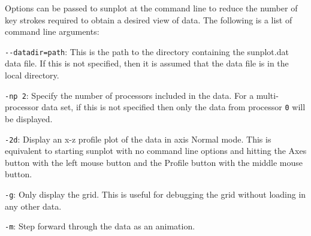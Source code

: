 Options can be passed to sunplot at the command line to reduce the number of key strokes
required to obtain a desired view of data.  The following is a list of command line arguments:
\begin{list}{}
\item \verb+--datadir=path+: This is the path to the directory containing the sunplot.dat
data file.  If this is not specified, then it is assumed that the data file is in the local
directory.
\item \verb+-np 2+: Specify the number of processors included in the data.  For a multi-processor
data set, if this is not specified then only the data from processor \verb+0+ will be displayed.
\item \verb+-2d+: Display an x-z profile plot of the data in axis Normal mode.  This is equivalent
to starting sunplot with no command line options and hitting the Axes button with the left mouse
button and the Profile button with the middle mouse button.
\item \verb+-g+: Only display the grid.  This is useful for debugging the grid without loading
in any other data.
\item \verb+-m+: Step forward through the data as an animation.
\end{list}
